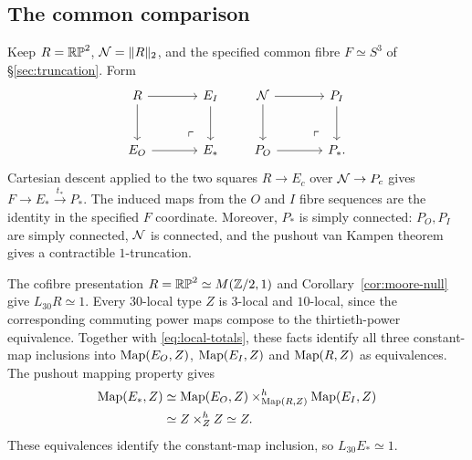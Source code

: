 \subsection{The common comparison}\label{sec:common}
Keep $R=\RP^2$, $\baseN=\trunc2R$, and the specified common fibre $F\simeq S^3$ of \S\ref{sec:truncation}. Form
\[
\begin{tikzcd}[column sep=large,row sep=large]
R \arrow[r] \arrow[d] \pomark & E_I \arrow[d] \\
E_O \arrow[r] & E_*
\end{tikzcd}
\qquad
\begin{tikzcd}[column sep=large,row sep=large]
\baseN \arrow[r] \arrow[d] \pomark & P_I \arrow[d] \\
P_O \arrow[r] & P_*.
\end{tikzcd}
\]
Cartesian descent applied to the two squares $R\to E_c$ over $\baseN\to P_c$ gives $F\to E_*\xrightarrow{t_*}P_*$. The induced maps from the $O$ and $I$ fibre sequences are the identity in the specified $F$ coordinate. Moreover, $P_*$ is simply connected: $P_O,P_I$ are simply connected, $\baseN$ is connected, and the pushout van Kampen theorem gives a contractible $1$-truncation.

The cofibre presentation $R=\RP^2\simeq\Moore21$ and Corollary~\ref{cor:moore-null} give $L_{30}R\simeq1$. Every $30$-local type $Z$ is $3$-local and $10$-local, since the corresponding commuting power maps compose to the thirtieth-power equivalence. Together with \eqref{eq:local-totals}, these facts identify all three constant-map inclusions into $\Map(E_O,Z)$, $\Map(E_I,Z)$ and $\Map(R,Z)$ as equivalences. The pushout mapping property gives
\begin{align*}
\Map(E_*,Z)
&\simeq\Map(E_O,Z)\hpb_{\Map(R,Z)}\Map(E_I,Z)\\
&\simeq Z\hpb_ZZ\simeq Z.
\end{align*}
These equivalences identify the constant-map inclusion, so $L_{30}E_*\simeq1$.

